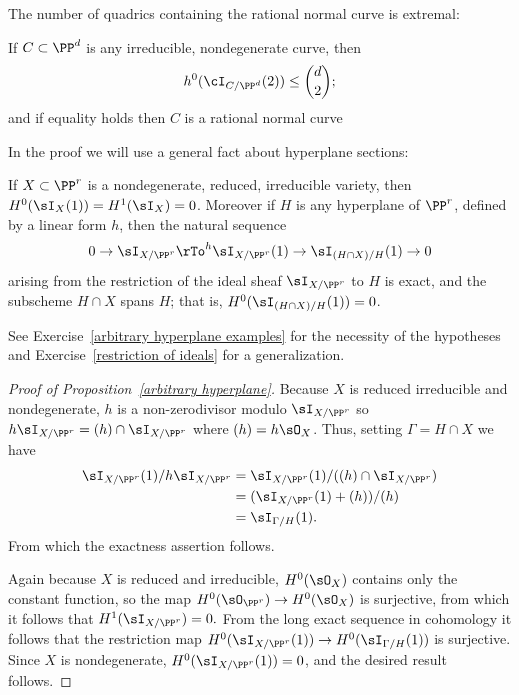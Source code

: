 The number of quadrics containing the rational normal curve is extremal:

\begin{proposition}\label{rnc on most quadrics}
If $C \subset \PP^d$ is any irreducible, nondegenerate curve, then
$$
h^0(\cI_{C/\PP^d}(2)) \leq  \binom{d}{2};
$$
and if equality holds then $C$ is a rational normal curve
\end{proposition}

In the proof we will use a general fact about hyperplane sections:

\begin{proposition}\label{arbitrary hyperplane}
If $X\subset \PP^r$ is a nondegenerate, reduced, irreducible variety, 
then $H^0(\sI_X(1)) = H^1 (\sI_X) = 0$. Moreover if $H$ is any hyperplane of $\PP^r$, defined by
a linear form $h$, then the natural
sequence
$$
0\to \sI_{X/\PP^r} \rTo^h \sI_{X/\PP^r}(1)\to \sI_{(H\cap X)/H}(1)\to 0
$$
arising from the restriction of the ideal sheaf $\sI_{X/\PP^r}$ to $H$ is exact, and the subscheme
$H\cap X$ spans $H$; that is, $H^0(\sI_{(H\cap X)/H}(1)) = 0$.
\end{proposition}

See Exercise~\ref{arbitrary hyperplane examples} for the necessity of the hypotheses
and Exercise~\ref{restriction of ideals} for a generalization. 

\begin{proof}[Proof of Proposition~\ref{arbitrary hyperplane}]
Because $X$ is reduced irreducible and nondegenerate,
$h$ is a non-zerodivisor modulo $\sI_{X/\PP^r}$ so $h\sI_{X/\PP^r} = (h)\cap \sI_{X/\PP^r}$ where
$(h) = h\sO_{X}$. Thus, setting $\Gamma = {H\cap X}$
we have 
$$
\begin{aligned}
\sI_{X/\PP^r}(1)/h\sI_{X/\PP^r} &= \sI_{X/\PP^r}(1)/((h)\cap\sI_{X/\PP^r})\\
 &=(\sI_{X/\PP^r}(1)+(h))/(h)\\
 &= \sI_{\Gamma/H}(1).
\end{aligned}
 $$
 From which the exactness assertion follows.
 
 Again because $X$ is reduced and irreducible, $H^0(\sO_X)$ contains only the constant function, so the map $H^0(\sO_{\PP^r}) \to H^0(\sO_X)$ is surjective, 
from which it follows that $H^1(\sI_{X/\PP^r}) = 0.$ From the long exact sequence in cohomology it follows that
 the restriction map $H^0(\sI_{X/\PP^r}(1))\to H^0(\sI_{\Gamma/H}(1))$ is surjective. Since
$X$ is nondegenerate, $H^0(\sI_{X/\PP^r}(1)) = 0$, and the desired result follows.
\end{proof}


